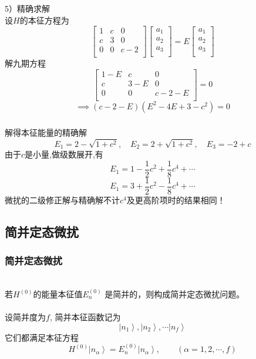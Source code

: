 \begin{frame}
  \frametitle{}
5）精确求解 \\
设$H$的本征方程为
$$ \begin{bmatrix}
  1 & c & 0  \\
  c & 3 & 0  \\
  0 & 0 & c-2 \\ 
\end{bmatrix}  \begin{bmatrix}
  a_1 \\
  a_2 \\
  a_3 \\ 
\end{bmatrix} = E \begin{bmatrix}
  a_1 \\
  a_2 \\
  a_3 \\ 
\end{bmatrix}
$$ 
解九期方程
$$ \begin{bmatrix}
  1-E & c & 0  \\
  c & 3-E & 0  \\
  0 & 0 & c-2-E \\ 
\end{bmatrix} =0 $$
$$ \implies (c-2-E)(E^2-4E+3-c^2) =0 $$
\end{frame} 

\begin{frame}
  \frametitle{}
解得本征能量的精确解
$$ E_1 = 2- \sqrt{1+c^2}, \quad  E_2 = 2 + \sqrt{1+c^2}, \quad  E_3 = -2 + c $$
由于$c$是小量,做级数展开,有
$$ E_1 = 1-\frac{1}{2}c^2 + \frac{1}{8} c^4 + \cdots $$
$$ E_1 = 3+\frac{1}{2}c^2 - \frac{1}{8} c^4 + \cdots $$
微扰的二级修正解与精确解不计$c^4$及更高阶项时的结果相同！
\end{frame} 

\subsection{简并定态微扰}

\begin{frame}
  \frametitle{简并定态微扰}
  ~~\\ 
若$H^{(0)}$的能量本征值$ E_n^{(0)}$ 是简并的，则构成简并定态微扰问题。\\

~~\\ 
设简并度为$f$, 简并本征函数记为
$$ \left\vert n_1 \right\rangle, \left\vert n_2 \right\rangle,\cdots \left\vert n_f \right\rangle $$
它们都满足本征方程
\[ H^{(0)} \left\vert n_\alpha \right\rangle = E_n^{(0)} \left\vert n_\alpha \right\rangle, \qquad (\alpha =1, 2, \cdots, f) \]
\end{frame} 

